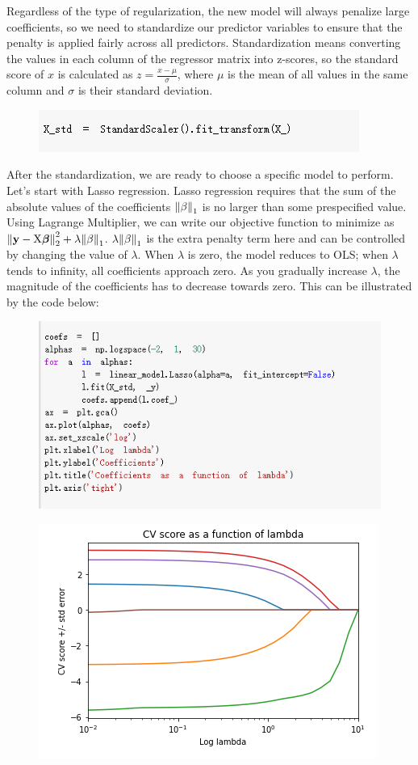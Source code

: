 \documentclass{article}
\begin{document}
Regardless of the type of regularization, the new model will always penalize large coefficients, so we need to standardize our predictor variables to ensure that the penalty is applied fairly across all predictors. Standardization means converting the values in each column of the regressor matrix into z-scores, so the standard score of $x$ is calculated as $z = \frac{x - \mu}{\sigma}$, where $\mu$ is the mean of all values in the same column and $\sigma$ is their standard deviation.
\begin{figure}[H]\includegraphics[width=0.6\linewidth]{33}\end{figure}
After the standardization, we are ready to choose a specific model to perform. Let's start with Lasso regression. Lasso regression requires that the sum of the absolute values of the coefficients $\norm{\beta}_1$ is no larger than some prespecified value. Using Lagrange Multiplier, we can write our objective function to minimize as $\norm{\mathbf{y} - \text{X} \bm{\beta}}^2_2 + \lambda \norm{\beta}_1$. $\lambda \norm{\beta}_1$ is the extra penalty term here and can be controlled by changing the value of $\lambda$. When $\lambda$ is zero, the model reduces to OLS; when $\lambda$ tends to infinity, all coefficients approach zero. As you gradually increase $\lambda$, the magnitude of the coefficients has to decrease towards zero. This can be illustrated by the code below:
\begin{figure}[H]\includegraphics[width=0.8\linewidth]{34}\end{figure}
\begin{figure}[H]\centering\includegraphics[width=0.5\linewidth]{35}\end{figure}
\end{document}
